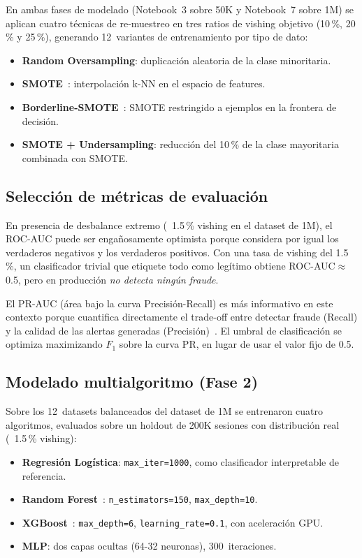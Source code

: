 \documentclass[journal]{IEEEtran}
\newcommand{\prauc}{\textsc{PR-AUC}}
\newcommand{\rocauc}{\textsc{ROC-AUC}}
\begin{document}
En ambas fases de modelado (Notebook~3 sobre 50K y Notebook~7 sobre 1M) se
aplican cuatro técnicas de re-muestreo en tres ratios de vishing objetivo
(10\,\%, 20\,\% y 25\,\%), generando 12~variantes de entrenamiento por tipo
de dato:

\begin{itemize}
    \item \textbf{Random Oversampling}: duplicación aleatoria de la clase
    minoritaria.
    \item \textbf{SMOTE}~\cite{chawla2002smote}: interpolación k-NN en el
    espacio de features.
    \item \textbf{Borderline-SMOTE}~\cite{han2005borderline}: SMOTE restringido
    a ejemplos en la frontera de decisión.
    \item \textbf{SMOTE + Undersampling}: reducción del 10\,\% de la clase
    mayoritaria combinada con SMOTE.
\end{itemize}

\subsection{Selección de métricas de evaluación}

En presencia de desbalance extremo (~1.5\,\% vishing en el dataset de 1M), el
\rocauc{} puede ser engañosamente optimista porque considera por igual los
verdaderos negativos y los verdaderos positivos. Con una tasa de vishing del
1.5\,\%, un clasificador trivial que etiquete todo como legítimo obtiene
ROC-AUC$\approx$0.5, pero en producción \emph{no detecta ningún fraude}.

El \prauc{} (área bajo la curva Precisión-Recall) es más informativo en este
contexto porque cuantifica directamente el trade-off entre detectar fraude
(Recall) y la calidad de las alertas generadas (Precisión)~\cite{davis2006pr}.
El umbral de clasificación se optimiza maximizando $F_1$ sobre la curva PR,
en lugar de usar el valor fijo de 0.5.

\subsection{Modelado multialgoritmo (Fase 2)}

Sobre los 12~datasets balanceados del dataset de 1M se entrenaron cuatro
algoritmos, evaluados sobre un holdout de 200K sesiones con distribución
real (~1.5\,\% vishing):

\begin{itemize}
    \item \textbf{Regresión Logística}: \texttt{max\_iter=1000}, como
    clasificador interpretable de referencia.
    \item \textbf{Random Forest}~\cite{breiman2001rf}: \texttt{n\_estimators=150},
    \texttt{max\_depth=10}.
    \item \textbf{XGBoost}~\cite{chen2016xgboost}: \texttt{max\_depth=6},
    \texttt{learning\_rate=0.1}, con aceleración GPU.
    \item \textbf{MLP}: dos capas ocultas (64-32 neuronas), 300~iteraciones.
\end{itemize}
\end{document}
